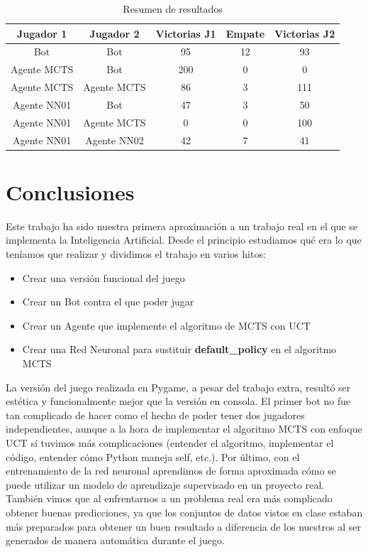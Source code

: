 \documentclass[conference,a4paper]{IEEEtran}
\begin{document}
\begin{table}
  \caption{Resumen de resultados}
  \label{tab:resultssummary}
  \centering
  \begin{tabular}{ccccc}
    \toprule
    Jugador 1 & Jugador 2 & Victorias J1 & Empate & Victorias J2 \\
    \midrule
    Bot & Bot & 95 & 12 & 93 \\
    Agente MCTS & Bot & 200 & 0 & 0 \\
    Agente MCTS & Agente MCTS & 86 & 3 & 111 \\
    Agente NN01 & Bot & 47 & 3 & 50\\
    Agente NN01 & Agente MCTS & 0 & 0 & 100 \\
    Agente NN01 & Agente NN02 & 42 & 7 & 41 \\
    \bottomrule
  \end{tabular}
\end{table}


\section{Conclusiones}

Este trabajo ha sido nuestra primera aproximación a un trabajo real en el que se
implementa la Inteligencia Artificial. Desde el principio estudiamos qué era lo
que teníamos que realizar y dividimos el trabajo en varios hitos:
\begin{itemize}
  \item Crear una versión funcional del juego
  \item Crear un Bot contra el que poder jugar
  \item Crear un Agente que implemente el algoritmo de MCTS con UCT
  \item Crear una Red Neuronal para sustituir \textbf{default\_policy} en el algoritmo MCTS
\end{itemize}
La versión del juego realizada en Pygame, a pesar del trabajo extra, resultó
ser estética y funcionalmente mejor que la versión en consola. El primer bot no
fue tan complicado de hacer como el hecho de poder tener dos jugadores independientes,
aunque a la hora de implementar el algoritmo MCTS con enfoque UCT sí tuvimos más
complicaciones (entender el algoritmo, implementar el código, entender cómo Python
maneja self, etc.). Por último, con el entrenamiento de la red neuronal aprendimos
de forma aproximada cómo se puede utilizar un modelo de aprendizaje supervisado en un
proyecto real. También vimos que al enfrentarnos a un problema real era más complicado
obtener buenas predicciones, ya que los conjuntos de datos vistos en clase estaban
más preparados para obtener un buen resultado a diferencia de los nuestros al ser generados
de manera automática durante el juego.
\end{document}

